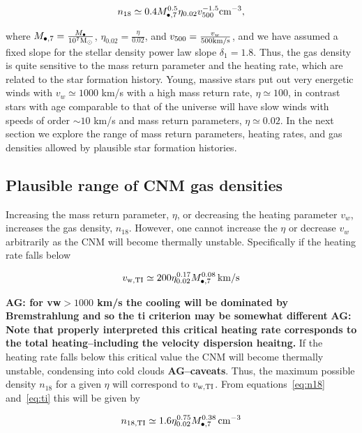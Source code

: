 \documentclass[usenatbib,fleqn]{mnras}
\newcommand{\Mbh}[1][]{M_{\bullet#1}}
\newcommand{\Msun}{{\rm M_\odot}}
\begin{document}
\begin{equation}
n_{18}\simeq 0.4 \Mbh[,7]^{0.5} \eta_{0.02} v_{500}^{-1.5} {\rm
  cm^{-3}},
\label{eq:n18}
\end{equation}

where $\Mbh[,7]=\frac{\Mbh}{10^7 \Msun}$,
$\eta_{0.02}=\frac{\eta}{0.02}$, and $v_{500}=\frac{v_w}{500 {\rm
    km/s}}$, and we have assumed a fixed slope for the stellar density
power law slope $\delta_1=1.8$. Thus, the gas density is quite
sensitive to the mass return parameter and the heating rate, which are
related to the star formation history. Young, massive stars put out
very energetic winds with $v_w\simeq 1000$ km/s with a high mass
return rate, $\eta\simeq 100$, in contrast stars with age comparable
to that of the universe will have slow winds with speeds of order $\sim
10$ km/s and mass return parameters, $\eta\simeq0.02$. In the next
section we explore the range of mass return parameters, heating rates,
and gas densities allowed by plausible star formation histories.

\subsection{Plausible range of CNM gas densities}
Increasing the mass return parameter, $\eta$, or decreasing the
heating parameter $v_w$, increases the gas density, $n_{18}$.
However, one cannot increase the $\eta$ or decrease $v_w$ arbitrarily
as the CNM will become thermally unstable. Specifically if the heating
rate falls below

\begin{equation}
v_{\rm w,TI}\simeq 200 \eta_{0.02}^{0.17} \Mbh[,7]^{0.08} \,{\rm km/s} 
\label{eq:ti}
\end{equation}

{\bf AG: for vw$>1000$ km/s the cooling will be dominated by
  Bremstrahlung and so the ti criterion may be somewhat different} {\bf
  AG: Note that properly interpreted this critical heating rate
  corresponds to the total heating--including the velocity dispersion
  heaitng.}  
If the heating rate falls below this critical value the
CNM will become thermally unstable, condensing into cold clouds {\bf
  AG--caveats}. Thus, the maximum possible density $n_{18}$ for a
given $\eta$ will correspond to $v_{\rm w,TI}$. From
equations~\eqref{eq:n18} and~\eqref{eq:ti} this will be given by

\begin{equation}
n_{\rm 18,TI}\simeq 1.6 \eta_{0.02}^{0.75} \Mbh[,7]^{0.38} \, {\rm cm^{-3}}
\label{eq:n18ti}
\end{equation}
\end{document}
